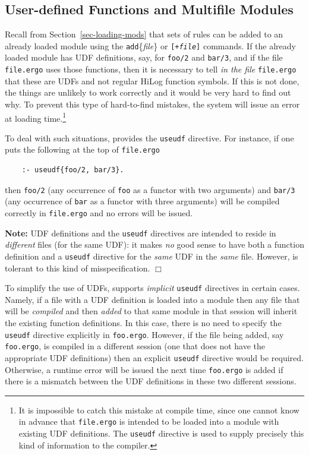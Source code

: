 \documentclass[11pt]{article}
\newcommand{\ERGO}{\mbox{\smaller{\ensuremath{\cal{E}}\smaller{{\sc{RGO}}}}}\xspace}
\newcommand{\FLSYSTEM}{\ERGO}
\newcommand{\ergoext}{ergo\xspace}
\begin{document}
\subsection{User-defined Functions and Multifile Modules}

Recall from Section~\ref{sec-loading-mods} that sets of rules can be added to 
an already loaded module using the \texttt{add}\{\emph{file}\}
or \texttt{[+\textnormal{\emph{file}}]}
commands.  
If the already loaded module has UDF definitions, say, for \texttt{foo/2}
and \texttt{bar/3}, and if 
the file \texttt{file.\ergoext} uses those functions, then it is necessary to
tell \FLSYSTEM \emph{in the file}   \texttt{file.\ergoext} that these are UDFs and not regular HiLog
function symbols. If this is not done, the things are unlikely to work
correctly and it would be very hard to find out why.
To prevent this type of hard-to-find mistakes, the system
will issue an error at loading time.\footnote{
  It is impossible to catch this mistake at compile time, since one
  cannot know in advance that \texttt{file.\ergoext} is intended to
  be loaded into a module with existing UDF definitions.
  The \texttt{useudf} directive is used to supply precisely this kind
  of information to the compiler.
  }

To deal with such situations, \FLSYSTEM provides the \texttt{useudf}
directive. For instance, if one puts the following at the top of
\texttt{file.\ergoext}
\begin{verbatim}
    :- useudf{foo/2, bar/3}.
\end{verbatim}
then \texttt{foo/2} (any occurrence of \texttt{foo} as  a functor with two
arguments)  and \texttt{bar/3} (any occurrence of \texttt{bar} as a functor
with three arguments)
will be compiled correctly in \texttt{file.\ergoext} and
no errors will be issued.

\noindent
\textbf{Note:} UDF definitions and the \texttt{useudf} directives are intended
to reside in \emph{different} files (for the same UDF):
it makes \emph{no} good sense to have both a function definition and a
\texttt{useudf} directive for the \emph{same} UDF in the \emph{same}
file. However, \FLSYSTEM is tolerant to this kind of misspecification.
\hfill$\Box$

To simplify the use of UDFs, \FLSYSTEM supports \emph{implicit}
\texttt{useudf} directives in certain cases. Namely, if a file with
a UDF definition is loaded into a module then any file that will be
\emph{compiled} and then \emph{added} to that same module in that \FLSYSTEM session
will inherit the existing function definitions. In this case, there is no
need to specify the \texttt{useudf} directive explicitly in
\texttt{foo.\ergoext}.
However, if the file being added, say \texttt{foo.\ergoext},
is compiled in a different \FLSYSTEM session
(one that does not have the appropriate UDF definitions) then an explicit
\texttt{useudf} directive would be required. Otherwise, a runtime
error will be issued the next time \texttt{foo.\ergoext} is added if there is a
mismatch between the UDF definitions in these two different \FLSYSTEM sessions. 
\end{document}
